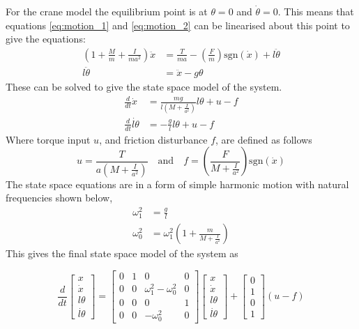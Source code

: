 \documentclass{article}
\begin{document}
For the crane model the equilibrium point is at $\theta = 0$ and $\dot{\theta} = 0$.
This means that equations \ref{eq:motion_1} and \ref{eq:motion_2} can be linearised about this point to give the equations:
\begin{align}
  \left( 1 + \frac{M}{m} + \frac{I}{ma^2} \right) \ddot{x} &= \frac{T}{ma} - \left(\frac{F}{m}\right)\text{sgn}(\dot{x}) + l \ddot{\theta} \label{eq:crane_motion_1} \\
  l \ddot{\theta} &= \ddot{x} - g\theta \label{eq:crane_motion_2}
\end{align}
These can be solved to give the state space model of the system.
\begin{align}
  \frac{d}{dt} \dot{x} &= \frac{mg}{l\left(M+\frac{I}{a^2}\right)} l\theta + u - f \\
  \frac{d}{dt} \dot{l\theta} &= -\frac{g}{l}l\theta + u - f
\end{align}
Where torque input $u$, and friction disturbance $f$, are defined as follows
\begin{equation}
  u = \frac{T}{a\left(M+\frac{I}{a^2}\right)} \quad \text{and} \quad f = \left(\frac{F}{M + \frac{I}{a^2}} \right) \text{sgn} (\dot{x})
  \label{eq:ss_system_inputs}
\end{equation}
The state space equations are in a form of simple harmonic motion with natural frequencies shown below,
\begin{align}
  \omega_1^2 &= \frac{g}{l} \\
  \omega_0^2 &= \omega_1^2\left(1 + \frac{m}{M+\frac{I}{a^2}} \right)
\end{align}
This gives the final state space model of the system as

\begin{equation}
  \frac{d}{dt} 
  \begin{bmatrix}
     x \\ \dot{x} \\ l\theta \\ \dot{l\theta} \end{bmatrix} = \begin{bmatrix} 
      0 & 1 & 0 & 0 \\ 0 & 0 & \omega_1^2 - \omega_0^2 & 0 \\ 0 & 0 & 0 & 1 \\ 0 & 0 & -\omega_0^2 & 0 \end{bmatrix} \begin{bmatrix} 
        x \\ \dot{x} \\ l\theta \\ \dot{l\theta} \end{bmatrix} + \begin{bmatrix} 
          0 \\ 1 \\ 0 \\ 1 \end{bmatrix} (u - f)
\end{equation}
\end{document}
